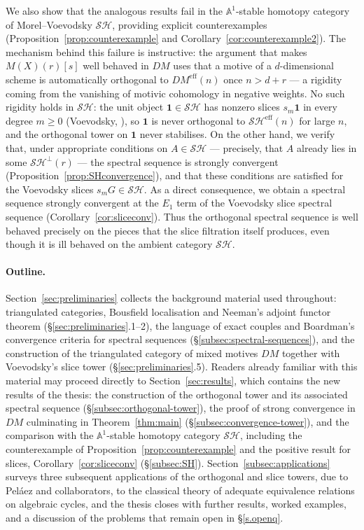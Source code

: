 \documentclass[12pt,a4paper]{article}
\theoremstyle{definition}
\newcommand{\SH}{\mathcal{SH}}
\begin{document}
We also show that the analogous results fail in the $\mathbb{A}^1$-stable homotopy
category of Morel–Voevodsky $\SH$, providing explicit counterexamples
(Proposition~\ref{prop:counterexample} and Corollary~\ref{cor:counterexample2}).
The mechanism behind this failure is instructive: the argument that makes
$M(X)(r)[s]$ well behaved in $DM$ uses that a motive of a $d$-dimensional scheme is
automatically orthogonal to $DM^{\mathrm{eff}}(n)$ once $n>d+r$ — a rigidity coming from
the vanishing of motivic cohomology in negative weights.  No such rigidity holds in
$\SH$: the unit object $\mathbf{1}\in\SH$ has nonzero slices $s_m\mathbf{1}$ in
every degree $m\geq 0$ (Voevodsky, \cite{Voe02a}), so $\mathbf{1}$ is never
orthogonal to $\SH^{\mathrm{eff}}(n)$ for large $n$, and the orthogonal tower on
$\mathbf{1}$ never stabilises.  On the other hand, we verify that, under
appropriate conditions on $A\in\SH$ — precisely, that $A$ already lies in some
$\SH^\perp(r)$ — the spectral sequence is strongly convergent
(Proposition~\ref{prop:SHconvergence}), and that these conditions are satisfied
for the Voevodsky slices $s_mG\in\SH$.  As a direct consequence, we obtain a
spectral sequence strongly convergent at the $E_1$ term of the Voevodsky slice
spectral sequence (Corollary~\ref{cor:sliceconv}).  Thus the orthogonal spectral
sequence is well behaved precisely on the pieces that the slice filtration itself
produces, even though it is ill behaved on the ambient category $\SH$.

\paragraph{Outline.}  Section~\ref{sec:preliminaries} collects the background
material used throughout: triangulated categories, Bousfield localisation and
Neeman's adjoint functor theorem (\S\ref{sec:preliminaries}.1–2), the language of
exact couples and Boardman's convergence criteria for spectral sequences
(\S\ref{subsec:spectral-sequences}), and the construction of the triangulated
category of mixed motives $DM$ together with Voevodsky's slice tower
(\S\ref{sec:preliminaries}.5).  Readers already familiar with this material may
proceed directly to Section~\ref{sec:results}, which contains the new results of
the thesis: the construction of the orthogonal tower and its associated spectral
sequence (\S\ref{subsec:orthogonal-tower}), the proof of strong convergence in
$DM$ culminating in Theorem~\ref{thm:main} (\S\ref{subsec:convergence-tower}), and
the comparison with the $\mathbb{A}^1$-stable homotopy category $\SH$, including
the counterexample of Proposition~\ref{prop:counterexample} and the positive
result for slices, Corollary~\ref{cor:sliceconv}
(\S\ref{subsec:SH}).  Section~\ref{subsec:applications} surveys three subsequent
applications of the orthogonal and slice towers, due to Peláez and
collaborators, to the classical theory of adequate equivalence relations on
algebraic cycles, and the thesis closes with further results, worked examples,
and a discussion of the problems that remain open in \S\ref{s.openq}.
\end{document}
